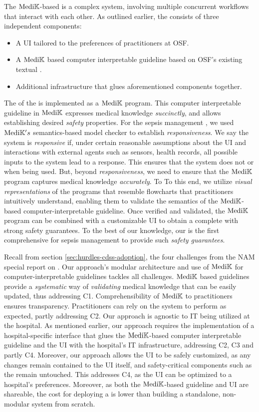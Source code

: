 The $\text{Medi}\mathbb{K}{}$-based \CDSS{} is a complex system, involving multiple
concurrent workflows that interact with each other. As outlined earlier,
the \CDSS{} consists of three independent components:
\begin{itemize}
  \itemsep0.0em
  \item A UI tailored to the preferences of practitioners at OSF.
  \item A $\text{Medi}\mathbb{K}{}{}$ based computer interpretable guideline based on OSF's
    existing textual \BPG{}.
  \item Additional infrastructure that glues aforementioned components together.
\end{itemize}


The \BPGLogic{} of the \CDSS{} is implemented as a $\text{Medi}\mathbb{K}{}{}$ program.
This computer interpretable guideline in $\text{Medi}\mathbb{K}{}$ expresses
medical knowledge \emph{succinctly}, and allows establishing desired \emph{safety} properties.
For the sepsis management \CDSS{}, we used $\text{Medi}\mathbb{K}{}{}'s$ semantics-based model checker to
establish \emph{responsiveness}. We say the system is \emph{responsive} if,
under certain reasonable assumptions about the UI and interactions with external
agents such as sensors, health records, all possible inputs to the
system lead to a response. This ensures that the system does not
 or  when being used. But, beyond \emph{responsiveness},
we need to ensure that the $\text{Medi}\mathbb{K}{}{}$ program captures medical knowledge \emph{accurately}. To
To this end, we utilize \emph{visual representations} of the programs that
resemble flowcharts that practitioners intuitively understand,
enabling them to validate the semantics of the $\text{Medi}\mathbb{K}{}{}$-based
computer-interpretable guideline. Once verified and validated, the $\text{Medi}\mathbb{K}{}{}$ program
can be combined with a customizable UI to obtain a complete \CDSS{} with
strong safety guarantees. To the best of our knowledge, our is the first
comprehensive \CDSSs{} for sepsis management to provide such \emph{safety
guarantees}.

Recall from section \ref{sec:hurdles-cdss-adoption}, the four challenges from
the NAM{} special report on \CDSSs{}. Our approach's modular architecture and
use of $\text{Medi}\mathbb{K}{}{}$ for computer-interpretable guidelines tackles all
challenges. $\text{Medi}\mathbb{K}{}{}$ based guidelines provide a \emph{systematic} way of
\emph{validating} medical knowledge that can be easily updated, thus addressing
C1. Comprehensibility of $\text{Medi}\mathbb{K}{}{}$ to practitioners ensures transparency.
Practitioners can rely on the system to perform as expected, partly addressing C2.
Our approach is agnostic to IT being utilized at the
hospital. As mentioned earlier, our approach requires the implementation
of a hospital-specific interface that glues the $\text{Medi}\mathbb{K}{}{}$-based
computer interpretable guideline and the UI with the hospital's IT
infrastructure, addressing C2, C3 and partly C4. Moreover,
our approach allows the UI to be safely customized,
as any changes remain contained to the UI itself, and safety-critical
components such as the \BPGLogic{} remain untouched. This addresses C4,
as the UI can be optimized to a hospital's preferences. Moreover,
as both the $\text{Medi}\mathbb{K}{}{}$-based guideline and UI are shareable, the cost
for deploying a \CDSS{} is lower than building a standalone,
non-modular system from scratch.


